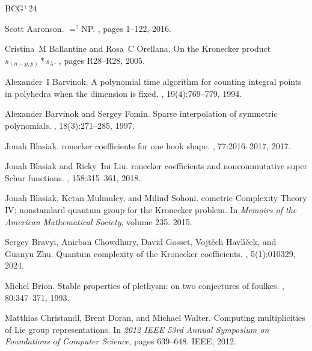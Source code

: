 \documentclass[11pt]{amsart}
\theoremstyle{plain}
\theoremstyle{definition}
\numberwithin{equation}{section}
\begin{document}
\newcommand{\etalchar}[1]{$^{#1}$}
\begin{thebibliography}{BCG{\etalchar{+}}24}

Scott Aaronson.
$=^?${NP}.
, pages 1--122, 2016.


Cristina~M Ballantine and Rosa~C Orellana.
\newblock On the {K}ronecker product $s_{(n-p, p)}\ast s_\lambda$.
, pages R28--R28, 2005.

Alexander~I Barvinok.
\newblock A polynomial time algorithm for counting integral points in polyhedra
  when the dimension is fixed.
, 19(4):769--779, 1994.

Alexander Barvinok and Sergey Fomin.
\newblock Sparse interpolation of symmetric polynomials.
, 18(3):271--285, 1997.


Jonah Blasiak.
ronecker coefficients for one hook shape.
, 77:2016--2017, 2017.

Jonah Blasiak and Ricky~Ini Liu.
ronecker coefficients and noncommutative super {S}chur functions.
, 158:315--361, 2018.

Jonah Blasiak, Ketan Mulmuley, and Milind Sohoni.
eometric {C}omplexity {T}heory {I}{V}: nonstandard quantum group
  for the {K}ronecker problem.
\newblock In {\em Memoirs of the American Mathematical Society}, volume 235.
  2015.

\bibitem[BCG{\etalchar{+}}24]{bravyi2024quantum}
Sergey Bravyi, Anirban Chowdhury, David Gosset, Vojt{\v{e}}ch
  Havl{\'\i}{\v{c}}ek, and Guanyu Zhu.
\newblock Quantum complexity of the {K}ronecker coefficients.
, 5(1):010329, 2024.







Michel Brion.
\newblock Stable properties of plethysm: on two conjectures of foulkes.
, 80:347--371, 1993.

Matthias Christandl, Brent Doran, and Michael Walter.
\newblock Computing multiplicities of {L}ie group representations.
\newblock In {\em 2012 IEEE 53rd Annual Symposium on Foundations of Computer
  Science}, pages 639--648. IEEE, 2012.


\end{thebibliography}
\end{document}
